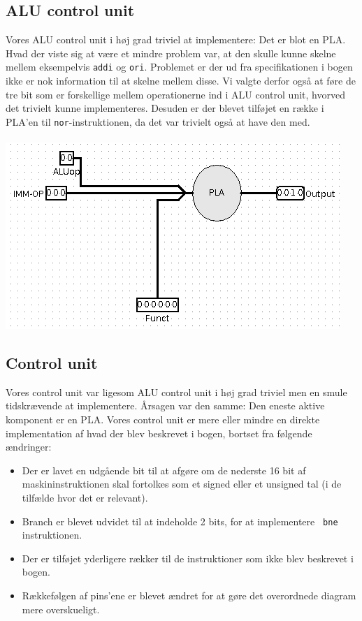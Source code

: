 \subsection{ALU control unit}
Vores ALU control unit i høj grad triviel at implementere: Det er blot en
PLA. Hvad der viste sig at være et mindre problem var, at den skulle kunne
skelne mellem eksempelvis {\tt addi} og {\tt ori}. Problemet er der ud fra
specifikationen i bogen ikke er nok information til at skelne mellem disse. Vi
valgte derfor også at føre de tre bit som er forskellige mellem operationerne
ind i ALU control unit, hvorved det trivielt kunne implementeres. Desuden er der
blevet tilføjet en række i PLA'en til {\tt nor}-instruktionen, da det var
trivielt også at have den med. \\
\\
\includegraphics{Billeder/single_cycle_alucontrol.png}

\subsection{Control unit}
Vores control unit var ligesom ALU control unit i høj grad triviel men en smule
tidskrævende at implementere. Årsagen var den samme: Den eneste aktive komponent
er en PLA. Vores control unit er mere eller mindre en direkte implementation af
hvad der blev beskrevet i bogen, bortset fra følgende ændringer:

\begin{itemize}
\item Der er lavet en udgående bit til at afgøre om de nederste 16 bit af
maskininstruktionen skal fortolkes som et signed eller et unsigned tal (i de
tilfælde hvor det er relevant).
\item Branch er blevet udvidet til at indeholde 2 bits, for at implementere {\tt
bne} instruktionen.
\item Der er tilføjet yderligere rækker til de instruktioner som ikke blev
beskrevet i bogen.
\item Rækkefølgen af pins'ene er blevet ændret for at gøre det overordnede
diagram mere overskueligt.
\end{itemize}

